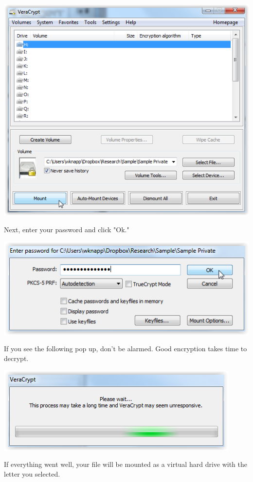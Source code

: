 \documentclass[12pt]{article}
\begin{document}
\includegraphics{imgs/VC09.PNG}

Next, enter your password and click "Ok."

\includegraphics{imgs/VC10.PNG}

If you see the following pop up, don't be alarmed. Good encryption takes time to decrypt.

\includegraphics{imgs/VC11.PNG}

If everything went well, your file will be mounted as a virtual hard drive with the letter
you selected.
\end{document}
